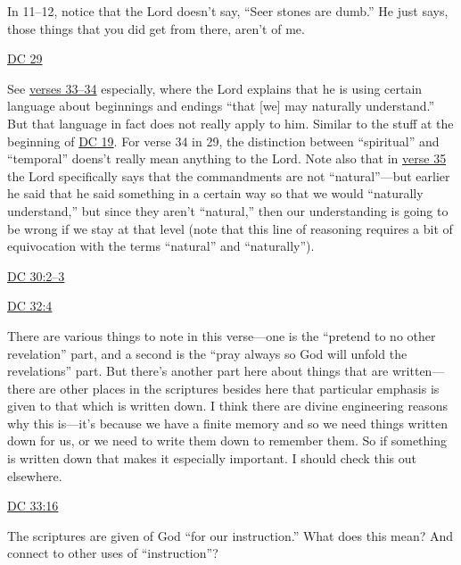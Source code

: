 \begin{compactdesc}
\begin{compactitem}
\begin{compactitem}
						\end{compactitem}
					\item In 11--12, notice that the Lord doesn't say, ``Seer stones are dumb.'' He just says, those things that you did get from there, aren't of me. 
				\end{compactitem}
			\item \hyperref[DC29]{DC 29}
				\begin{compactitem}
					\item See \hyperref[DC29-33]{verses 33--34} especially, where the Lord explains that he is using certain language about beginnings and endings ``that [we] may naturally understand.'' But that language in fact does not really apply to him. Similar to the stuff at the beginning of \hyperref[DC19]{DC 19}. For verse 34 in 29, the distinction between ``spiritual'' and ``temporal'' doens't really mean anything to the Lord. Note also that in \hyperref[DC29-35]{verse 35} the Lord specifically says that the commandments are not ``natural''---but earlier he said that he said something in a certain way so that we would ``naturally understand,'' but since they aren't ``natural,'' then our understanding is going to be wrong if we stay at that level (note that this line of reasoning requires a bit of equivocation with the terms ``natural'' and ``naturally'').
				\end{compactitem}
			\item \hyperref[DC30-2]{DC 30:2--3}
			\item \hyperref[DC32-4]{DC 32:4}
				\begin{compactitem}
					\item There are various things to note in this verse---one is the ``pretend to no other revelation'' part, and a second is the ``pray always so God will unfold the revelations'' part. But there's another part here about things that are written---there are other places in the scriptures besides here that particular emphasis is given to that which is written down. I think there are divine engineering reasons why this is---it's because we have a finite memory and so we need things written down for us, or we need to write them down to remember them. So if something is written down that makes it especially important. I should check this out elsewhere.
				\end{compactitem}
			\item \hyperref[DC33-16]{DC 33:16}
				\begin{compactitem}
					\item The scriptures are given of God ``for our instruction.'' What does this mean? And connect to other uses of ``instruction''?

\end{compactitem}
\end{compactdesc}
